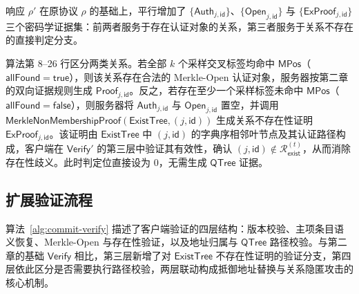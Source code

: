 响应 $\rho'$ 在原协议 $\rho$ 的基础上，平行增加了 $\{\mathsf{Auth}_{j,\mathsf{id}}\}$、$\{\mathsf{Open}_{j,\mathsf{id}}\}$ 与 $\{\mathsf{ExProof}_{j,\mathsf{id}}\}$ 三个密码学证据集：前两者服务于存在认证对象的关系，第三者服务于关系不存在的直接判定分支。

算法第 8--26 行区分两类关系。若全部 $k$ 个采样交叉标签均命中 $\mathsf{MPos}$（$\mathsf{allFound}=\mathsf{true}$），则该关系存在合法的 Merkle-Open 认证对象，服务器按第二章的双向证据规则生成 $\mathsf{Proof}_{j,\mathsf{id}}$。反之，若存在至少一个采样标签未命中 $\mathsf{MPos}$（$\mathsf{allFound}=\mathsf{false}$），则服务器将 $\mathsf{Auth}_{j,\mathsf{id}}$ 与 $\mathsf{Open}_{j,\mathsf{id}}$ 置空，并调用 $\mathsf{MerkleNonMembershipProof}(\mathsf{ExistTree},(j,\mathsf{id}))$ 生成关系不存在性证明 $\mathsf{ExProof}_{j,\mathsf{id}}$。该证明由 $\mathsf{ExistTree}$ 中 $(j,\mathsf{id})$ 的字典序相邻叶节点及其认证路径构成，客户端在 $\mathsf{Verify}'$ 的第三层中验证其有效性，确认 $(j,\mathsf{id})\notin\mathcal{R}_{\mathsf{exist}}^{(t)}$，从而消除存在性歧义。此时判定位直接设为 $0$，无需生成 $\mathsf{QTree}$ 证据。

\subsection{扩展验证流程}

算法~\ref{alg:commit-verify} 描述了客户端验证的四层结构：版本校验、主项条目语义恢复、Merkle-Open 与存在性验证，以及地址归属与 $\mathsf{QTree}$ 路径校验。与第二章的基础 $\mathsf{Verify}$ 相比，第三层新增了对 $\mathsf{ExistTree}$ 不存在性证明的验证分支，第四层依此区分是否需要执行路径校验，两层联动构成抵御地址替换与关系隐匿攻击的核心机制。

